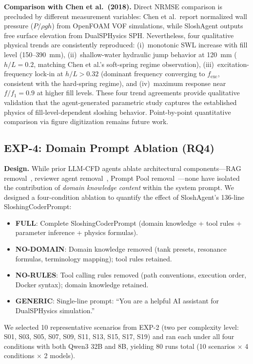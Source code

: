 \documentclass[11pt]{article}
\begin{document}
\textbf{Comparison with Chen et al.\ (2018).} Direct NRMSE comparison is precluded by different measurement variables: Chen et al.\ report normalized wall pressure ($P/\rho g h$) from OpenFOAM VOF simulations, while SloshAgent outputs free surface elevation from DualSPHysics SPH. Nevertheless, four qualitative physical trends are consistently reproduced: (i)~monotonic SWL increase with fill level (150--390~mm), (ii)~shallow-water hydraulic jump behavior at 120~mm ($h/L = 0.2$, matching Chen et al.'s soft-spring regime observation), (iii)~excitation-frequency lock-in at $h/L > 0.32$ (dominant frequency converging to $f_{\text{exc}}$, consistent with the hard-spring regime), and (iv)~maximum response near $f/f_1 = 0.9$ at higher fill levels. These four trend agreements provide qualitative validation that the agent-generated parametric study captures the established physics of fill-level-dependent sloshing behavior. Point-by-point quantitative comparison via figure digitization remains future work.

\subsection{EXP-4: Domain Prompt Ablation (RQ4)}

\textbf{Design.} While prior LLM-CFD agents ablate architectural components---RAG removal~\citep{metaopenfoam2024, mooseagent2025}, reviewer agent removal~\citep{foamagent2025}, Prompt Pool removal~\citep{openfoamgpt2025}---none have isolated the contribution of \textit{domain knowledge content} within the system prompt. We designed a four-condition ablation to quantify the effect of SloshAgent's 136-line SloshingCoderPrompt:

\begin{itemize}[noitemsep]
  \item \textbf{FULL}: Complete SloshingCoderPrompt (domain knowledge + tool rules + parameter inference + physics formulas).
  \item \textbf{NO-DOMAIN}: Domain knowledge removed (tank presets, resonance formulas, terminology mapping); tool rules retained.
  \item \textbf{NO-RULES}: Tool calling rules removed (path conventions, execution order, Docker syntax); domain knowledge retained.
  \item \textbf{GENERIC}: Single-line prompt: ``You are a helpful AI assistant for DualSPHysics simulation.''
\end{itemize}

We selected 10 representative scenarios from EXP-2 (two per complexity level: S01, S03, S05, S07, S09, S11, S13, S15, S17, S19) and ran each under all four conditions with both Qwen3 32B and 8B, yielding 80 runs total (10 scenarios $\times$ 4 conditions $\times$ 2 models).
\end{document}
